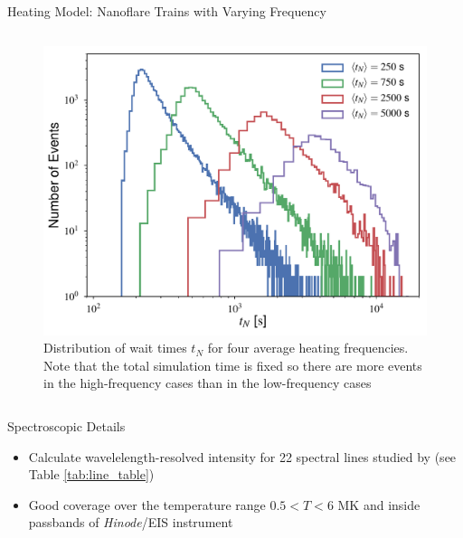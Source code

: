 \documentclass[final]{beamer}
\begin{document}
\begin{frame}
\begin{columns}[T]
\begin{column}{0.49\linewidth}
\begin{block}{Heating Model: Nanoflare Trains with Varying Frequency}
\begin{columns}[T]
\begin{column}{0.49\columnwidth}
\begin{figure}
        \includegraphics[width=\columnwidth]{figures/wait_time_distributions.pdf}
        \caption{Distribution of wait times $t_N$ for four average heating frequencies. Note that the total simulation time is fixed so there are more events in the high-frequency cases than in the low-frequency cases} 
        \label{fig:wait_times}
        \end{figure}
      \end{column}
      \end{columns}
    \end{block}
    \begin{block}{Spectroscopic Details}
      \begin{itemize}
        \item Calculate wavelelength-resolved intensity for 22 spectral lines studied by \citet{warren_systematic_2012} (see Table \ref{tab:line_table})
        \item Good coverage over the temperature range $0.5<T<6$ MK and inside passbands of \textit{Hinode}/EIS instrument
      \end{itemize}
      \begin{columns}[T]
        \begin{column}{0.49\columnwidth}
          \begin{figure}

\end{figure}
\end{column}
\end{columns}
\end{block}
\end{column}
\end{columns}
\end{frame}
\end{document}
